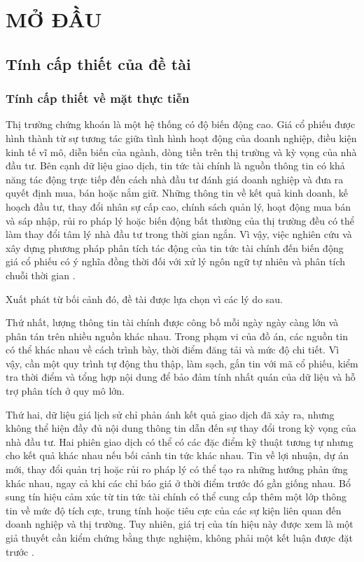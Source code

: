 \chapter{MỞ ĐẦU}
\label{ch:mo-dau}

\section{Tính cấp thiết của đề tài}
\label{sec:ly-do}

\subsection{Tính cấp thiết về mặt thực tiễn}

Thị trường chứng khoán là một hệ thống có độ biến động cao. Giá cổ phiếu được hình
thành từ sự tương tác giữa tình hình hoạt động của doanh nghiệp, điều kiện kinh tế vĩ
mô, diễn biến của ngành, dòng tiền trên thị trường và kỳ vọng của nhà đầu tư. Bên cạnh
dữ liệu giao dịch, tin tức tài chính là nguồn thông tin có khả năng tác động trực tiếp
đến cách nhà đầu tư đánh giá doanh nghiệp và đưa ra quyết định mua, bán hoặc nắm giữ.
Những thông tin về kết quả kinh doanh, kế hoạch đầu tư, thay đổi nhân sự cấp cao, chính
sách quản lý, hoạt động mua bán và sáp nhập, rủi ro pháp lý hoặc biến động bất thường
của thị trường đều có thể làm thay đổi tâm lý nhà đầu tư trong thời gian ngắn. Vì vậy,
việc nghiên cứu và xây dựng phương pháp phân tích tác động của tin tức tài chính đến
biến động giá cổ phiếu có ý nghĩa đồng thời đối với xử lý ngôn ngữ tự nhiên và phân tích
chuỗi thời gian \cite{Chen2019_191005078v1,Chen2021_210708721v1}.


Xuất phát từ bối cảnh đó, đề tài được lựa chọn vì các lý do sau.

Thứ nhất, lượng thông tin tài chính được công bố mỗi ngày ngày càng lớn và phân tán
trên nhiều nguồn khác nhau. Trong phạm vi của đồ án, các nguồn tin có thể khác nhau
về cách trình bày, thời điểm đăng tải và mức độ chi tiết. Vì vậy, cần một quy trình
tự động thu thập, làm sạch, gắn tin với mã cổ phiếu, kiểm tra thời điểm và tổng hợp
nội dung để bảo đảm tính nhất quán của dữ liệu và hỗ trợ phân tích ở quy mô lớn.


Thứ hai, dữ liệu giá lịch sử chỉ phản ánh kết quả giao dịch đã xảy ra, nhưng không thể
hiện đầy đủ nội dung thông tin dẫn đến sự thay đổi trong kỳ vọng của nhà đầu tư. Hai
phiên giao dịch có thể có các đặc điểm kỹ thuật tương tự nhưng cho kết quả khác nhau
nếu bối cảnh tin tức khác nhau. Tin về lợi nhuận, dự án mới, thay đổi quản trị hoặc rủi
ro pháp lý có thể tạo ra những hướng phản ứng khác nhau, ngay cả khi các chỉ báo giá ở
thời điểm trước đó gần giống nhau. Bổ sung tín hiệu cảm xúc từ tin tức tài chính có thể
cung cấp thêm một lớp thông tin về mức độ tích cực, trung tính hoặc tiêu cực của các sự
kiện liên quan đến doanh nghiệp và thị trường. Tuy nhiên, giá trị của tín hiệu này được
xem là một giả thuyết cần kiểm chứng bằng thực nghiệm, không phải một kết luận được đặt
trước \cite{Jiang2023_230602136v3,Siala2026_260200086v3}.

